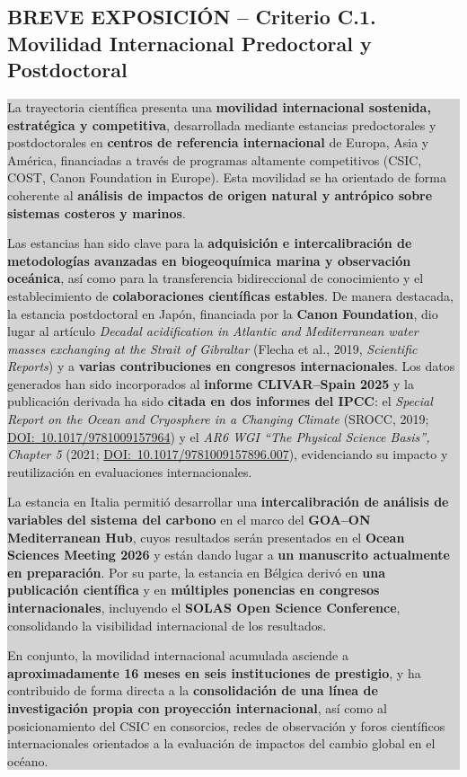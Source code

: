 \documentclass[11pt,a4paper]{article}
\newcommand{\breveexposicion}[2]{
    \subsection*{\color{darkgray}\textbf{BREVE EXPOSICIÓN -- #1}}
    \vspace{0.3em}
    \noindent\colorbox{lightgray}{%
        \begin{minipage}{0.97\textwidth}
        \vspace{0.5em}
        \color{darkgray}
        #2
        \vspace{0.5em}
        \end{minipage}
    }
    \vspace{1em}
}
\begin{document}
\breveexposicion{Criterio C.1. Movilidad Internacional Predoctoral y Postdoctoral}{
La trayectoria científica presenta una \textbf{movilidad internacional sostenida, estratégica y competitiva}, desarrollada mediante estancias predoctorales y postdoctorales en \textbf{centros de referencia internacional} de Europa, Asia y América, financiadas a través de programas altamente competitivos (CSIC, COST, Canon Foundation in Europe). Esta movilidad se ha orientado de forma coherente al \textbf{análisis de impactos de origen natural y antrópico sobre sistemas costeros y marinos}.

Las estancias han sido clave para la \textbf{adquisición e intercalibración de metodologías avanzadas en biogeoquímica marina y observación oceánica}, así como para la transferencia bidireccional de conocimiento y el establecimiento de \textbf{colaboraciones científicas estables}. De manera destacada, la estancia postdoctoral en Japón, financiada por la \textbf{Canon Foundation}, dio lugar al artículo \textit{Decadal acidification in Atlantic and Mediterranean water masses exchanging at the Strait of Gibraltar} (Flecha et al., 2019, \textit{Scientific Reports}) y a \textbf{varias contribuciones en congresos internacionales}. Los datos generados han sido incorporados al \textbf{informe CLIVAR--Spain 2025} y la publicación derivada ha sido \textbf{citada en dos informes del IPCC}: el \textit{Special Report on the Ocean and Cryosphere in a Changing Climate} (SROCC, 2019; \href{https://www.ipcc.ch/site/assets/uploads/sites/3/2022/03/SROCC_Ch05-SM_FINAL.pdf}{DOI:~10.1017/9781009157964}) y el \textit{AR6 WGI ``The Physical Science Basis'', Chapter 5} (2021; \href{https://www.ipcc.ch/report/ar6/wg1/downloads/report/IPCC_AR6_WGI_Chapter05_SM.pdf}{DOI:~10.1017/9781009157896.007}), evidenciando su impacto y reutilización en evaluaciones internacionales.

La estancia en Italia permitió desarrollar una \textbf{intercalibración de análisis de variables del sistema del carbono} en el marco del \textbf{GOA--ON Mediterranean Hub}, cuyos resultados serán presentados en el \textbf{Ocean Sciences Meeting 2026} y están dando lugar a \textbf{un manuscrito actualmente en preparación}. Por su parte, la estancia en Bélgica derivó en \textbf{una publicación científica} y en \textbf{múltiples ponencias en congresos internacionales}, incluyendo el \textbf{SOLAS Open Science Conference}, consolidando la visibilidad internacional de los resultados.

En conjunto, la movilidad internacional acumulada asciende a \textbf{aproximadamente 16 meses en seis instituciones de prestigio}, y ha contribuido de forma directa a la \textbf{consolidación de una línea de investigación propia con proyección internacional}, así como al posicionamiento del CSIC en consorcios, redes de observación y foros científicos internacionales orientados a la evaluación de impactos del cambio global en el océano.
}
\end{document}
